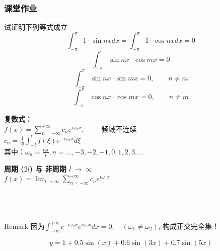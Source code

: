 \begin{frame}
	\frametitle{课堂作业}
	试证明下列等式成立
	\[\int_{-\pi} ^{\pi} 1 \cdot \sin nx dx = \int_{-\pi} ^{\pi} 1 \cdot \cos nx dx =0\]
	\[\int_{-\pi} ^{\pi}\sin nx\cdot \cos mx =0\]
	\[\int_{-\pi} ^{\pi}\sin nx\cdot \sin mx =0, \qquad n\neq m\]
	\[\int_{-\pi} ^{\pi}\cos nx\cdot \cos mx =0, \qquad n\neq m\]
\end{frame}

\begin{frame}
	\textbf{ \large 复数式：} \\  
	{\large  $\displaystyle f(x) =\sum_{n=-\infty}^{+\infty}  c_n e^{i\omega_n x}, \qquad $  频域不连续 }\\	
	{\large $\displaystyle c_n =\frac{1}{2l}  \int_{-l}^{l}  f(\xi)    e^{-i\omega_n x}  d\xi  $ }\\	
	其中：{\large $\displaystyle   \omega_n=\frac{n\pi}{l} ,  n=...,-3,-2,-1,0,1,2,3,...   $} \\
\end{frame}

\begin{frame}
	\textbf{\large 周期 ($2l$) 与 非周期  $l~\to ~\infty $  } \\
	{\large  $\displaystyle f(x) =\lim_{l\to \infty} \sum_{n=-\infty}^{+\infty}  c_n e^{i\omega_n x} $ }\\	
	\\	
	\\
	\\
	\begin{block} {Remark}
	因为$ \int_{-\infty}^{+\infty} e^{-i\omega_2 x} e^{i\omega_1 x}  dx = 0, \quad (\omega_1 \ne \omega_2 )$,
	构成正交完全集！
	\end{block}
\end{frame}

\begin{frame}
	\begin{equation*}
		y=1 + 0.5\sin(x)+0.6\sin(3x)+0.7\sin(5x)
	\end{equation*}    
\end{frame}

